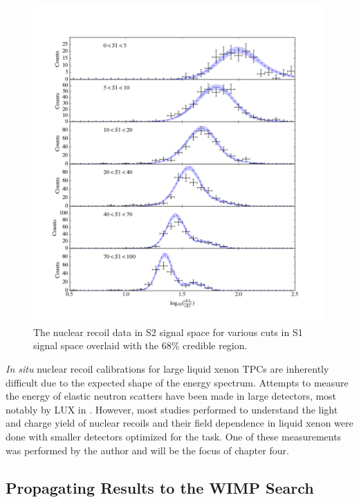 \begin{figure}[p]
	\centering
	\includegraphics[width=0.99\textwidth]{xe1t_nr_results_s2_slices}
	\caption{The nuclear recoil data in S2 signal space for various cuts in S1 signal space overlaid with the 68\% credible region.}
	\label{fig:xe1t_nr_cal_s2_slices}
\end{figure}


\textit{In situ} nuclear recoil calibrations for large liquid xenon TPCs are inherently difficult due to the expected shape of the energy spectrum.  Attempts to measure the energy of elastic neutron scatters have been made in large detectors, most notably by LUX in .  However, most studies performed to understand the light and charge yield of nuclear recoils and their field dependence in liquid xenon were done with smaller detectors optimized for the task.  One of these measurements was performed by the author and will be the focus of chapter four.


\subsection{Propagating Results to the WIMP Search}
\label{sec:xe1t_propagating_results}



